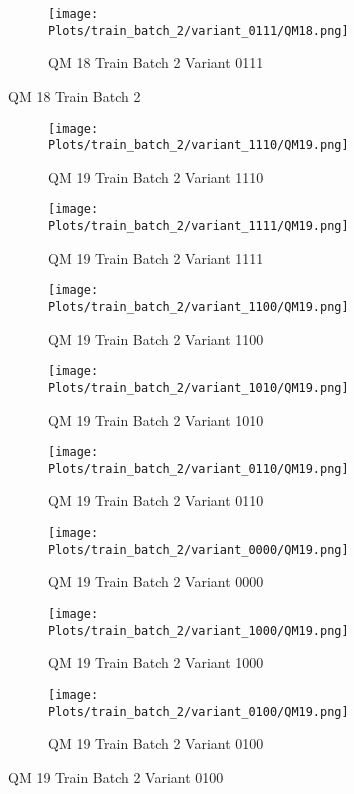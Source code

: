 \documentclass{DissertateFigs}
\begin{document}
\begin{figure}[t!]
\medskip

    \begin{subfigure}{0.47\textwidth}
    \texttt{[image: Plots/train\_batch\_2/variant\_0111/QM18.png]}
    \caption{QM 18 Train Batch 2 Variant 0111}
    \end{subfigure}
\caption{QM 18 Train Batch 2}
    \end{figure}
\clearpage
\begin{figure}[t!]
    \begin{subfigure}{0.47\textwidth}
    \texttt{[image: Plots/train\_batch\_2/variant\_1110/QM19.png]}
    \caption{QM 19 Train Batch 2 Variant 1110}
    \end{subfigure}
    \begin{subfigure}{0.47\textwidth}
    \texttt{[image: Plots/train\_batch\_2/variant\_1111/QM19.png]}
    \caption{QM 19 Train Batch 2 Variant 1111}
    \end{subfigure}

\medskip

    \begin{subfigure}{0.47\textwidth}
    \texttt{[image: Plots/train\_batch\_2/variant\_1100/QM19.png]}
    \caption{QM 19 Train Batch 2 Variant 1100}
    \end{subfigure}
    \begin{subfigure}{0.47\textwidth}
    \texttt{[image: Plots/train\_batch\_2/variant\_1010/QM19.png]}
    \caption{QM 19 Train Batch 2 Variant 1010}
    \end{subfigure}

\medskip

    \begin{subfigure}{0.47\textwidth}
    \texttt{[image: Plots/train\_batch\_2/variant\_0110/QM19.png]}
    \caption{QM 19 Train Batch 2 Variant 0110}
    \end{subfigure}
    \begin{subfigure}{0.47\textwidth}
    \texttt{[image: Plots/train\_batch\_2/variant\_0000/QM19.png]}
    \caption{QM 19 Train Batch 2 Variant 0000}
    \end{subfigure}

\medskip

    \begin{subfigure}{0.47\textwidth}
    \texttt{[image: Plots/train\_batch\_2/variant\_1000/QM19.png]}
    \caption{QM 19 Train Batch 2 Variant 1000}
    \end{subfigure}
    \begin{subfigure}{0.47\textwidth}
    \texttt{[image: Plots/train\_batch\_2/variant\_0100/QM19.png]}
    \caption{QM 19 Train Batch 2 Variant 0100}
    \end{subfigure}


\end{figure}
\end{document}
